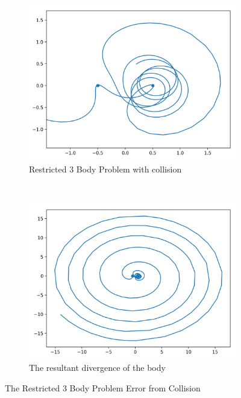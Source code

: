 \documentclass{article}
\begin{document}
\begin{figure}[H]
    \centering
    \begin{subfigure}[b]{0.4\textwidth}
        \includegraphics[width=\textwidth]{images/r3b_collision.png}
        \caption{Restricted 3 Body Problem with collision}
        \label{fig:r3b_collision}
    \end{subfigure}
    ~
    \begin{subfigure}[b]{0.4\textwidth}
        \includegraphics[width=\textwidth]{images/r3b_collision_whole.png}
        \caption{The resultant divergence of the body}
        \label{fig:r3b_collision_whole}
    \end{subfigure}
    \caption{The Restricted 3 Body Problem Error from Collision}
    \label{fig:singularity}
\end{figure}
\end{document}
